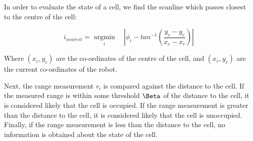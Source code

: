 \documentclass[11pt]{article} %
\begin{document}
In order to evaluate the state of a cell, we find the scanline which passes closest to the centre of the cell:

\begin{equation}
i_{nearest} = \underset{i}{\operatorname{argmin}} \quad | \phi_i - tan^{-1}(\frac{y_c - y_r}{x_c - x_r}) |
\end{equation}

Where $(x_c, y_c)$ are the co-ordinates of the centre of the cell, and $(x_r, y_r)$ are the current co-ordinates of the robot.  

Next, the range measurement $r_i$ is compared against the distance to the cell.  If the measured range is within some threshold $\Beta$ of the distance to the cell, it is considered likely that the cell is occupied.  If the range measurement is greater than the distance to the cell, it is considered likely that the cell is unoccupied.  Finally, if the range measurement is less than the distance to the cell, no information is obtained about the state of the cell.
\end{document}
